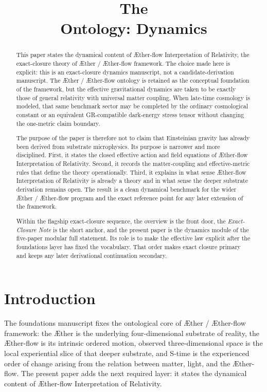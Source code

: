 \documentclass[11pt]{article}
\title{The \TheoryName{}\\[0.4em]
Ontology: Dynamics}
\author{}
\date{}
\newcommand{\Aether}{\AE{}ther}
\newcommand{\Aflow}{\AE{}ther-flow}
\newcommand{\TheoryName}{\Aflow{} Interpretation of Relativity}
\newcommand{\TheoryProgram}{\Aether{} / \Aflow{} framework}
\begin{document}
\AetherFlowAPATitlePage

\begin{abstract}
This paper states the dynamical content of \TheoryName{}, the exact-closure theory of \TheoryProgram{}. The choice made here is explicit: this is an exact-closure dynamics manuscript, not a candidate-derivation manuscript. The \Aether{} / \Aflow{} ontology is retained as the conceptual foundation of the framework, but the effective gravitational dynamics are taken to be exactly those of general relativity with universal matter coupling. When late-time cosmology is modeled, that same benchmark sector may be completed by the ordinary cosmological constant or an equivalent GR-compatible dark-energy stress tensor without changing the one-metric claim boundary.

The purpose of the paper is therefore not to claim that Einsteinian gravity has already been derived from substrate microphysics. Its purpose is narrower and more disciplined. First, it states the closed effective action and field equations of \TheoryName{}. Second, it records the matter-coupling and effective-metric rules that define the theory operationally. Third, it explains in what sense \TheoryName{} is already a theory and in what sense the deeper substrate derivation remains open. The result is a clean dynamical benchmark for the wider \Aether{} / \Aflow{} program and the exact reference point for any later extension of the framework.

Within the flagship exact-closure sequence, the overview is the front door, the \emph{Exact-Closure Note} is the short anchor, and the present paper is the dynamics module of the five-paper modular full statement. Its role is to make the effective law explicit after the foundations layer has fixed the vocabulary. That order makes exact closure primary and keeps any later derivational continuation secondary.
\end{abstract}

\section{Introduction}

The foundations manuscript fixes the ontological core of \TheoryProgram{}: the \Aether{} is the underlying four-dimensional substrate of reality, the \Aflow{} is its intrinsic ordered motion, observed three-dimensional space is the local experiential slice of that deeper substrate, and S-time is the experienced order of change arising from the relation between matter, light, and the \Aflow{}. The present paper adds the next required layer: it states the dynamical content of \TheoryName{}.
\end{document}
